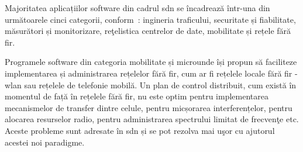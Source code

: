 Majoritatea aplicațiilor software din cadrul \gls{sdn} se încadrează într-una din următoarele cinci categorii, conform~\cite{kreutz2015software}: ingineria traficului, securitate și fiabilitate, măsurători și monitorizare, reţelistica centrelor de date, mobilitate și rețele fără fir.

Programele software din categoria mobilitate și microunde își propun să faciliteze implementarea și administrarea rețelelor fără fir, cum ar fi rețelele locale fără fir - \gls{wlan} sau rețelele de telefonie mobilă. Un plan de control distribuit, cum există în momentul de față în rețelele fără fir, nu este optim pentru implementarea mecanismelor de transfer dintre celule, pentru micșorarea interferențelor, pentru alocarea resurselor radio, pentru administrarea spectrului limitat de frecvenţe etc. Aceste probleme sunt adresate în \gls{sdn} și se pot rezolva mai uşor cu ajutorul acestei noi paradigme.
